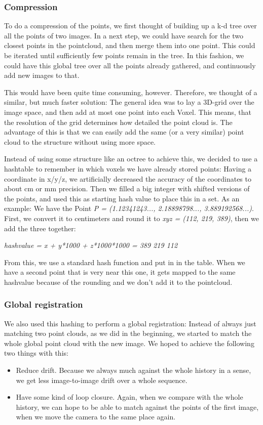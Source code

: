 \documentclass[10pt,twocolumn,letterpaper]{article}
\begin{document}
\subsubsection{Compression}
To do a compression of the points, we first thought of building up a k-d tree over all the points of two images. In a next step, we could have
search for the two closest points in the pointcloud, and then merge them into one point. This could be iterated until sufficiently few
points remain in the tree. In this fashion, we could have this global tree over all the points already gathered, and continuously add new
images to that.

This would have been quite time consuming, however. Therefore, we thought of a similar, but much faster solution:
The general idea was to lay a 3D-grid over the image space, and then add at most one point into each Voxel. This means, that the resolution
of the grid determines how detailed the point cloud is. The advantage of this is that we can easily add the same (or a very similar) point cloud
to the structure without using more space.

Instead of using some structure like an octree to achieve this, we decided to use a hashtable to remember in which voxels we have already stored points:
Having a coordinate in x/y/z, we artificially decreased the accuracy of the coordinates to about cm or mm precision. Then we filled a big integer with
shifted versions of the points, and used this as starting hash value to place this in a set. As an example: We have the Point
\textit{P = (1.12341243..., 2.18898798..., 3.889192568...)}. First, we convert it to centimeters and round
it to \textit{xyz = (112, 219, 389)}, then we add the three together:

\textit{hashvalue = x + y*1000 + z*1000*1000 = 389 219 112}

From this, we use a standard hash function and put in in the table. When we have a second
point that is very near this one, it gets mapped to the same hashvalue because of the rounding and we don't add it to the pointcloud.

\subsubsection{Global registration}
We also used this hashing to perform a global registration: Instead of always just matching two point clouds, as we did in the beginning, we started
to match the whole global point cloud with the new image. We hoped to achieve the following two things with this:
\begin{itemize}
\item Reduce drift. Because we always much against the whole history in a sense, we get less image-to-image drift over a whole sequence.
\item Have some kind of loop closure. Again, when we compare with the whole history, we can hope to be able to match against
the points of the first image, when we move the camera to the same place again.
\end{itemize}
\end{document}
